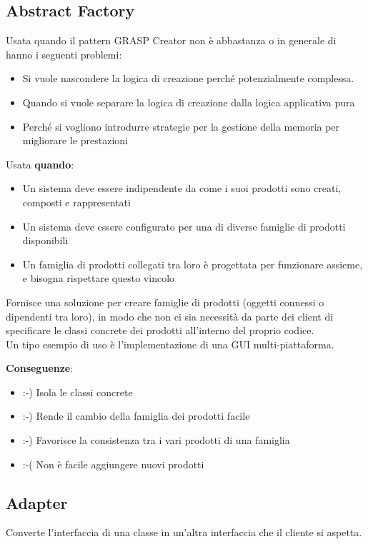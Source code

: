 \break
\subsection{Abstract Factory}
Usata quando il pattern GRASP Creator non \`e abbastanza o in generale di hanno i seguenti problemi:
\begin{itemize}
    \item Si vuole nascondere la logica di creazione perché potenzialmente complessa.
    \item Quando si vuole separare la logica di creazione dalla logica applicativa pura
    \item Perché si vogliono introdurre strategie per la gestione della memoria per migliorare le prestazioni
\end{itemize}

\noindent Usata \textbf{quando}:
\begin{itemize}
    \item Un sistema deve essere indipendente da come i suoi prodotti sono creati, composti e rappresentati
    \item Un sistema deve essere configurato per una di diverse famiglie di prodotti disponibili
    \item Un famiglia di prodotti collegati tra loro è progettata per funzionare assieme, e bisogna rispettare questo vincolo
\end{itemize}

\noindent Fornisce una soluzione per creare famiglie di prodotti (oggetti connessi o dipendenti tra loro), in modo che non ci sia necessità da parte dei client di specificare le classi concrete dei prodotti all’interno del proprio codice.\\
Un tipo esempio di uso \`e l'implementazione di una GUI multi-piattaforma.

\vspace{4mm}
\noindent \textbf{Conseguenze}:
\begin{itemize}
    \item :-) Isola le classi concrete
    \item :-) Rende il cambio della famiglia dei prodotti facile
    \item :-) Favorisce la consistenza tra i vari prodotti di una famiglia
    \item :-( Non è facile aggiungere nuovi prodotti
\end{itemize}

\subsection{Adapter}
Converte l’interfaccia di una classe in un’altra interfaccia che il cliente si aspetta.

